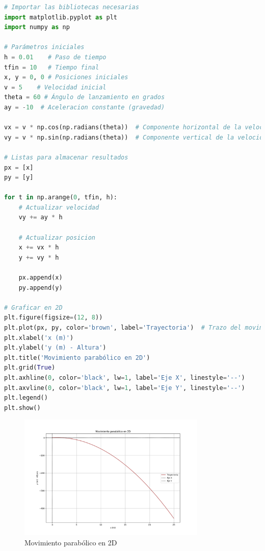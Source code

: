 \documentclass{article}
\begin{document}
\begin{center}
	\begin{lstlisting}[language=Python, caption={Análisis completo del movimiento parabólico}]
# Importar las bibliotecas necesarias
import matplotlib.pyplot as plt
import numpy as np

# Parámetros iniciales
h = 0.01    # Paso de tiempo
tfin = 10   # Tiempo final
x, y = 0, 0 # Posiciones iniciales
v = 5    # Velocidad inicial
theta = 60 # Ángulo de lanzamiento en grados
ay = -10  # Aceleracion constante (gravedad)

vx = v * np.cos(np.radians(theta))  # Componente horizontal de la velocidad
vy = v * np.sin(np.radians(theta))  # Componente vertical de la velocidad

# Listas para almacenar resultados
px = [x]
py = [y]

for t in np.arange(0, tfin, h):
    # Actualizar velocidad
    vy += ay * h

    # Actualizar posicion
    x += vx * h
    y += vy * h

    px.append(x)
    py.append(y)

# Graficar en 2D
plt.figure(figsize=(12, 8))
plt.plot(px, py, color='brown', label='Trayectoria')  # Trazo del movimiento
plt.xlabel('x (m)')
plt.ylabel('y (m) - Altura')
plt.title('Movimiento parabólico en 2D')
plt.grid(True)
plt.axhline(0, color='black', lw=1, label='Eje X', linestyle='--')
plt.axvline(0, color='black', lw=1, label='Eje Y', linestyle='--')
plt.legend()
plt.show()

	\end{lstlisting}

    \begin{figure}[H]
    \centering
    \includegraphics[width=0.8\textwidth]{img/2-1.png}
    \caption{Movimiento parabólico en 2D}
    \label{fig:salida_consola}
\end{figure}


\end{center}
\end{document}

